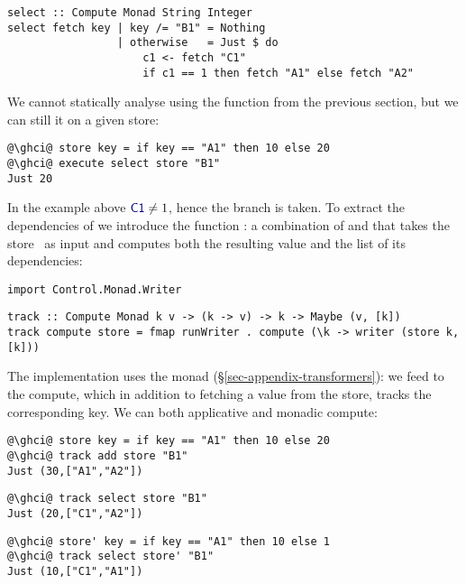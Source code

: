 \vspace{1mm}
\begin{verbatim}
select :: Compute Monad String Integer
select fetch key | key /= "B1" = Nothing
                 | otherwise   = Just $ do
                     c1 <- fetch "C1"
                     if c1 == 1 then fetch "A1" else fetch "A2"
\end{verbatim}
\vspace{1mm}

We cannot statically analyse  using the function 
from the previous section, but we can still  it on a given store:

\vspace{1mm}
\begin{verbatim}
@\ghci@ store key = if key == "A1" then 10 else 20
@\ghci@ execute select store "B1"
Just 20
\end{verbatim}
\vspace{1mm}

\noindent
In the example above $\cmd{C1} \neq 1$, hence the  branch is taken.
To extract the dependencies of  we introduce the function :
a combination of  and  that takes the store~\store
as input and computes both the resulting value and the list of its dependencies:

\vspace{1mm}
\begin{verbatim}
import Control.Monad.Writer
\end{verbatim}
\vspace{0.5mm}
\begin{verbatim}
track :: Compute Monad k v -> (k -> v) -> k -> Maybe (v, [k])
track compute store = fmap runWriter . compute (\k -> writer (store k, [k]))
\end{verbatim}
\vspace{1mm}

\noindent
The implementation uses the  monad (\S\ref{sec-appendix-transformers}):
we feed  to the compute, which in addition
to fetching a value from the store, tracks the corresponding key. We can
 both applicative and monadic compute:

\vspace{1mm}
\begin{verbatim}
@\ghci@ store key = if key == "A1" then 10 else 20
@\ghci@ track add store "B1"
Just (30,["A1","A2"])
\end{verbatim}
\vspace{1mm}
\begin{verbatim}
@\ghci@ track select store "B1"
Just (20,["C1","A2"])
\end{verbatim}
\vspace{1mm}
\begin{verbatim}
@\ghci@ store' key = if key == "A1" then 10 else 1
@\ghci@ track select store' "B1"
Just (10,["C1","A1"])
\end{verbatim}
\vspace{1mm}

